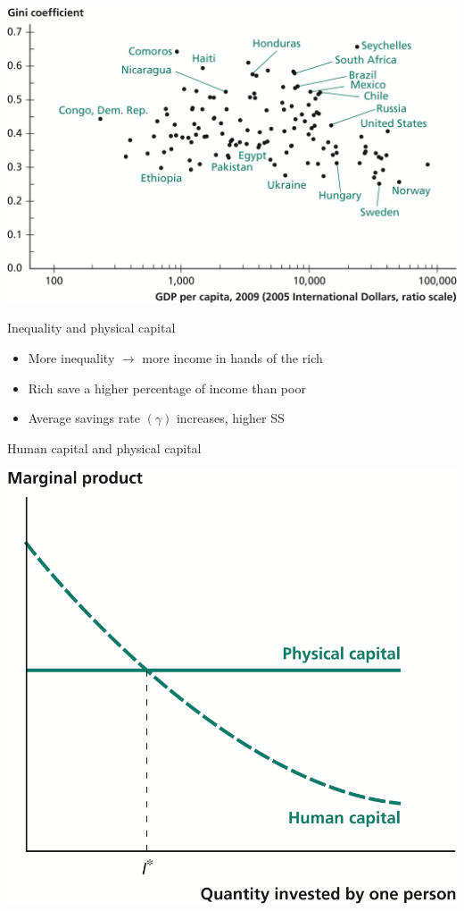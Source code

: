 \documentclass[10pt]{beamer}
\begin{document}
\begin{frame}[label={sec:orgbbd435c}]{}
\begin{center}
\includegraphics[width=.75\textwidth]{./img/13.5.png}
\end{center}
\end{frame}

\begin{frame}[label={sec:orgb36208f}]{}
\alert{Inequality and physical capital}
\begin{itemize}
\item More inequality \(\rightarrow\) more income in hands of the rich
\item Rich save a higher percentage of income than poor
\item Average savings rate \((\gamma )\) increases, higher SS
\end{itemize}
\end{frame}

\begin{frame}[label={sec:org1e5e3a5}]{Human capital and physical capital}
\begin{center}
\includegraphics[width=.75\textwidth]{./img/13.11.png}
\end{center}
\end{frame}
\end{document}

